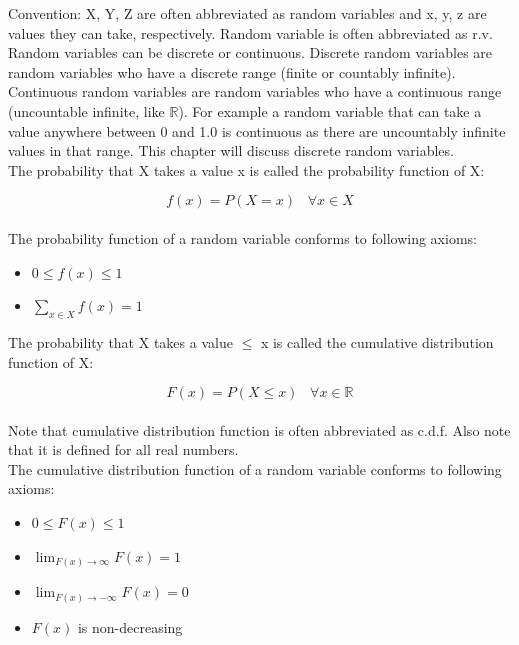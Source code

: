 \documentclass[12pt, letterpaper]{article}
\begin{document}
Convention: X, Y, Z are often abbreviated as random variables and x, y, z are values they can take, respectively. Random variable is often abbreviated as r.v.\\

Random variables can be discrete or continuous. Discrete random variables are random variables who have a discrete range (finite or countably infinite). Continuous random variables are random variables who have a continuous range (uncountable infinite, like \(\mathbb{R}\)). For example a random variable that can take a value anywhere between 0 and 1.0 is continuous as there are uncountably infinite values in that range. This chapter will discuss discrete random variables.\\

The probability that X takes a value x is called the probability function of X:

\begin{equation}
f\left(x\right) = P\left(X = x\right) \;\;\; \forall x \in X
\end{equation}\\

The probability function of a random variable conforms to following axioms:

\begin{itemize}
\item \(0 \leq f\left(x\right) \leq 1\)
\item \(\sum\limits_{x \in X} f\left(x\right) = 1\)
\end{itemize}

The probability that X takes a value \(\leq\) x is called the cumulative distribution function of X:

\begin{equation}
F\left(x\right) = P\left(X \leq x\right) \;\;\; \forall x \in \mathbb{R}
\end{equation}\\

Note that cumulative distribution function is often abbreviated as c.d.f. Also note that it is defined for all real numbers.\\

The cumulative distribution function of a random variable conforms to following axioms:

\begin{itemize}
\item \(0 \leq F\left(x\right) \leq 1\)
\item \(\lim_{F\left(x\right)\to\infty} F\left(x\right) = 1\)
\item \(\lim_{F\left(x\right)\to{- \infty}} F\left(x\right) = 0\)
\item \(F\left(x\right)\) is non-decreasing
\end{itemize}
\end{document}
